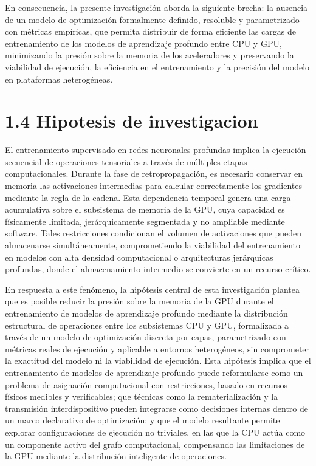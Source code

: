 En consecuencia, la presente investigación aborda la siguiente brecha: la ausencia de un modelo de optimización formalmente definido, resoluble y parametrizado con métricas empíricas, que permita distribuir de forma eficiente las cargas de entrenamiento de los modelos de aprendizaje profundo entre CPU y GPU, minimizando la presión sobre la memoria de los aceleradores y preservando la viabilidad de ejecución, la eficiencia en el entrenamiento y la precisión del modelo en plataformas heterogéneas.

\section{1.4 Hipotesis de investigacion}
El entrenamiento supervisado en redes neuronales profundas implica la ejecución secuencial de operaciones tensoriales a través de múltiples etapas computacionales. Durante la fase de retropropagación, es necesario conservar en memoria las activaciones intermedias para calcular correctamente los gradientes mediante la regla de la cadena. Esta dependencia temporal genera una carga acumulativa sobre el subsistema de memoria de la GPU, cuya capacidad es físicamente limitada, jerárquicamente segmentada y no ampliable mediante software. Tales restricciones condicionan el volumen de activaciones que pueden almacenarse simultáneamente, comprometiendo la viabilidad del entrenamiento en modelos con alta densidad computacional o arquitecturas jerárquicas profundas, donde el almacenamiento intermedio se convierte en un recurso crítico.

En respuesta a este fenómeno, la hipótesis central de esta investigación plantea que es posible reducir la presión sobre la memoria de la GPU durante el entrenamiento de modelos de aprendizaje profundo mediante la distribución estructural de operaciones entre los subsistemas CPU y GPU, formalizada a través de un modelo de optimización discreta por capas, parametrizado con métricas reales de ejecución y aplicable a entornos heterogéneos, sin comprometer la exactitud del modelo ni la viabilidad de ejecución. Esta hipótesis implica que el entrenamiento de modelos de aprendizaje profundo puede reformularse como un problema de asignación computacional con restricciones, basado en recursos físicos medibles y verificables; que técnicas como la rematerialización y la transmisión interdispositivo pueden integrarse como decisiones internas dentro de un marco declarativo de optimización; y que el modelo resultante permite explorar configuraciones de ejecución no triviales, en las que la CPU actúa como un componente activo del grafo computacional, compensando las limitaciones de la GPU mediante la distribución inteligente de operaciones.

